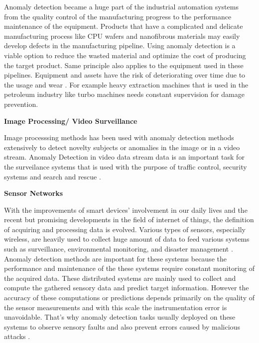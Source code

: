 Anomaly detection became a huge part of the industrial automation systems from the quality control
of the manufacturing progress to the performance maintenance of the equipment. Products that have
a complicated and delicate manufacturing process like CPU wafers \cite{Kim:2012:MLN:2076800.2076903} and nanofibrous
materials \cite{Napoletano2018anomaly} may easily develop defects in the manufacturing pipeline. Using
anomaly detection is a viable option to reduce the wasted material and optimize the cost of
producing the target product. Same principle also applies to the equipment used in these pipelines.
Equipment and assets have the risk of deteriorating over time due to the usage
and wear \cite{Pimentel:2014:RRN:2588908.2589196}. For example heavy extraction machines that is used in the
petroleum industry like turbo machines \cite{s150202774} needs constant supervision for damage
prevention. 

\textbf{ Image Processing/ Video Surveillance}

Image processsing methods has been used with anomaly detection methods extensively to detect novelty
subjects or anomalies in the image or in a video stream. Anomaly Detection in video data stream data is an
important task for the surveilance systems that is used with the purpose of traffic control,
security systems and search and rescue \cite{image_anomaly}.

\textbf{ Sensor Networks}

With the improvements of smart devices' involvement in our daily lives and the recent but promising developments
in the field of internet of things, the definition of acquiring and processing data is evolved.
Various types of sensors, especially wireless, are heavily used to collect huge amount of data to
feed various systems such as surveillance, environmental monitoring, and disaster management
\cite{UlIslam2018}. Anomaly detection methods are important for these systems because the performance and 
maintenance of the these systems require constant monitoring of the acquired data. These distributed 
systems are mainly used to collect and compute the gathered sensory data and predict target information. 
However the accuracy of these computations or predictions depends
primarily on the quality of the sensor measurements and with this scale the instrumentation error
is unavoidable. That's why anomaly detection tasks usually deployed on these systems to observe
sensory faults and also prevent errors caused by malicious attacks \cite{Pimentel:2014:RRN:2588908.2589196} \cite{iot_anomaly}.

